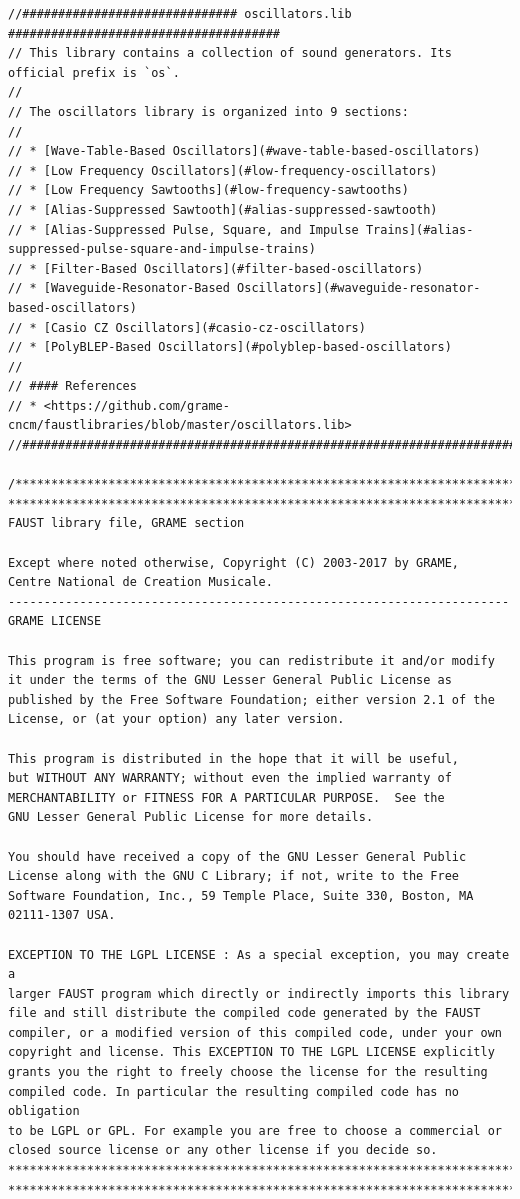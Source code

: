 \documentclass{article}
\begin{document}
\bigskip\bigskip
\begin{lstlisting}[caption=\texttt{oscillators.lib}]
//############################## oscillators.lib ######################################
// This library contains a collection of sound generators. Its official prefix is `os`.
//
// The oscillators library is organized into 9 sections:
//
// * [Wave-Table-Based Oscillators](#wave-table-based-oscillators)
// * [Low Frequency Oscillators](#low-frequency-oscillators)
// * [Low Frequency Sawtooths](#low-frequency-sawtooths)
// * [Alias-Suppressed Sawtooth](#alias-suppressed-sawtooth)
// * [Alias-Suppressed Pulse, Square, and Impulse Trains](#alias-suppressed-pulse-square-and-impulse-trains)
// * [Filter-Based Oscillators](#filter-based-oscillators)
// * [Waveguide-Resonator-Based Oscillators](#waveguide-resonator-based-oscillators)
// * [Casio CZ Oscillators](#casio-cz-oscillators)
// * [PolyBLEP-Based Oscillators](#polyblep-based-oscillators)
//
// #### References
// * <https://github.com/grame-cncm/faustlibraries/blob/master/oscillators.lib>
//########################################################################################

/************************************************************************
************************************************************************
FAUST library file, GRAME section

Except where noted otherwise, Copyright (C) 2003-2017 by GRAME,
Centre National de Creation Musicale.
----------------------------------------------------------------------
GRAME LICENSE

This program is free software; you can redistribute it and/or modify
it under the terms of the GNU Lesser General Public License as
published by the Free Software Foundation; either version 2.1 of the
License, or (at your option) any later version.

This program is distributed in the hope that it will be useful,
but WITHOUT ANY WARRANTY; without even the implied warranty of
MERCHANTABILITY or FITNESS FOR A PARTICULAR PURPOSE.  See the
GNU Lesser General Public License for more details.

You should have received a copy of the GNU Lesser General Public
License along with the GNU C Library; if not, write to the Free
Software Foundation, Inc., 59 Temple Place, Suite 330, Boston, MA
02111-1307 USA.

EXCEPTION TO THE LGPL LICENSE : As a special exception, you may create a
larger FAUST program which directly or indirectly imports this library
file and still distribute the compiled code generated by the FAUST
compiler, or a modified version of this compiled code, under your own
copyright and license. This EXCEPTION TO THE LGPL LICENSE explicitly
grants you the right to freely choose the license for the resulting
compiled code. In particular the resulting compiled code has no obligation
to be LGPL or GPL. For example you are free to choose a commercial or
closed source license or any other license if you decide so.
************************************************************************
************************************************************************/


\end{lstlisting}
\end{document}
